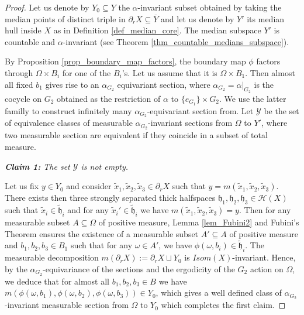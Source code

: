 \documentclass[10pt,a4paper]{amsart}
\def\bar{\overline}
\newcommand{\HH}{\mathcal{H}}     %
\newcommand{\YY}{\mathcal{Y}}     %
\newcommand{\hh}{\mathfrak{h}}    %
\begin{document}
\begin{proof}
Let us denote by $Y_0\subseteq Y$ the $\alpha$-invariant subset obtained by taking the median points of distinct triple in $\partial_r X\subseteq \bar Y$ and let us denote by $Y'$ its median hull inside $X$ as in Definition \ref{def_median_core}. The median subspace $Y'$ is countable and $\alpha$-invariant (see Theorem \ref{thm_countable_medians_subspace}). \par 
 By Proposition \ref{prop_boundary_map_factors}, the boundary map $\phi$ factors through $\Omega\times B_i$ for one of the $B_i$'s. Let us assume that it is $\Omega\times B_1$. Then almost all fixed $b_1$ gives rise to an $\alpha_{G_2}$ equivariant section, where $\alpha_{G_2} = \alpha|_{G_2}$ is the cocycle on $G_2$ obtained as the restriction of $\alpha$ to $\{e_{G_1}\}\times G_2$. We use the latter familly to construct infinitely many $\alpha_{G_2}$-equivariant section from. Let $\YY$ be the set of equivalence classes of measurable $\alpha_{G_2}$-invariant sections from $\Omega$ to $Y'$, where two measurable section are equivalent if they coincide in a subset of total measure.\par 
 \textit{\textbf{Claim 1:} The set $\YY$ is not empty. }\par 
 Let us fix $y\in Y_0$ and consider $\tilde{x}_1,\tilde{x}_2,\tilde{x}_3\in\partial_r X$ such that $y=m(\tilde{x}_1,\tilde{x}_2,\tilde{x}_3)$. There exists then three strongly separated thick halfspaces $\hh_1,\hh_2,\hh_3\in\HH(X)$ such that $\tilde{x}_i\in\tilde{\hh}_i$ and for any $\tilde{x}_i'\in\tilde{\hh}_i$ we have $m(\tilde{x}_1,\tilde{x}_2,\tilde{x}_3)=y$. Then for any measurable subset $A\subseteq \Omega$ of positive measure, Lemma \ref{lem_Fubini2} and Fubini's Theorem ensures the existence of a measurable subset $A'\subseteq A$ of positive measure  and $b_1,b_2,b_3\in B_1$ such that for any $\omega\in A'$, we have $\phi(\omega,b_i)\in\tilde{\hh}_i$. The measurable decomposition $m(\partial_r X):=\partial_r X\sqcup Y_0$ is $Isom(X)$-invariant. Hence, by the $\alpha_{G_2}$-equivariance of the sections and the ergodicity of the $G_2$ action on $\Omega$, we deduce that for almost all $b_1,b_2,b_3\in B$ we have $m(\phi(\omega,b_1),\phi(\omega,b_2),\phi(\omega,b_3))\in Y_0$, which gives a well defined class of $\alpha_{G_2}$-invariant measurable section from $\Omega$ to $Y_0$ which completes the first claim.  

\end{proof}
\end{document}
